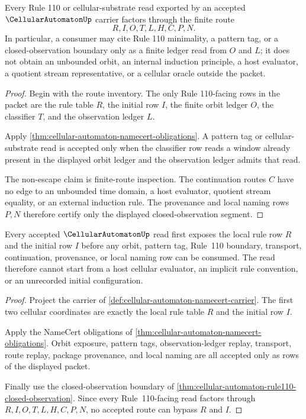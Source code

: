 \begin{theorem}
\label{thm:cellular-automaton-rule110-closed-observation}
Every Rule 110 or cellular-substrate read exported by an accepted $\CellularAutomatonUp$ carrier factors through the finite route
$$
R,I,O,T,L,H,C,P,N .
$$
In particular, a consumer may cite Rule 110 minimality, a pattern tag, or a closed-observation boundary only as a finite ledger read from $O$ and $L$; it does not obtain an unbounded orbit, an internal induction principle, a host evaluator, a quotient stream representative, or a cellular oracle outside the packet.
\end{theorem}
\begin{proof}
Begin with the route inventory. The only Rule 110-facing rows in the packet are the rule table $R$, the initial row $I$, the finite orbit ledger $O$, the classifier $T$, and the observation ledger $L$.

Apply \autoref{thm:cellular-automaton-namecert-obligations}. A pattern tag or cellular-substrate read is accepted only when the classifier row reads a window already present in the displayed orbit ledger and the observation ledger admits that read.

The non-escape claim is finite-route inspection. The continuation routes $C$ have no edge to an unbounded time domain, a host evaluator, quotient stream equality, or an external induction rule. The provenance and local naming rows $P,N$ therefore certify only the displayed closed-observation segment.
\end{proof}

\begin{theorem}
\label{thm:cellular-automaton-local-rule-exposure}
Every accepted $\CellularAutomatonUp$ read first exposes the local rule row $R$ and the initial row $I$ before any orbit, pattern tag, Rule~110 boundary, transport, continuation, provenance, or local naming row can be consumed. The read therefore cannot start from a host cellular evaluator, an implicit rule convention, or an unrecorded initial configuration.
\end{theorem}
\begin{proof}
Project the carrier of \autoref{def:cellular-automaton-namecert-carrier}. The first two cellular coordinates are exactly the local rule table $R$ and the initial row $I$.

Apply the NameCert obligations of \autoref{thm:cellular-automaton-namecert-obligations}. Orbit exposure, pattern tags, observation-ledger replay, transport, route replay, package provenance, and local naming are all accepted only as rows of the displayed packet.

Finally use the closed-observation boundary of \autoref{thm:cellular-automaton-rule110-closed-observation}. Since every Rule~110-facing read factors through $R,I,O,T,L,H,C,P,N$, no accepted route can bypass $R$ and $I$.
\end{proof}

